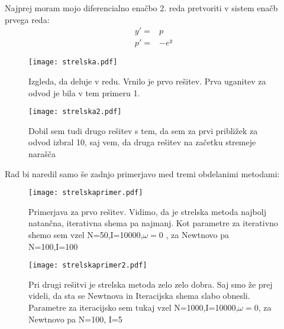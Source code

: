 \documentclass{article}
\begin{document}
Najprej moram mojo diferencialno enačbo 2. reda pretvoriti v sistem enačb prvega reda:
\begin{align*}
y' =& p \\
p' =& -e^y 
\end{align*}

\begin{figure}[H]
\texttt{[image: strelska.pdf]}
\caption*{Izgleda, da deluje v redu. Vrnilo je prvo rešitev. Prva uganitev za odvod je bila v tem primeru 1.} 
\end{figure}

\begin{figure}[H]
\texttt{[image: strelska2.pdf]}
\caption*{Dobil sem tudi drugo rešitev s tem, da sem za prvi približek za odvod izbral 10, saj vem, da druga rešitev na začetku stremeje narašča} 
\end{figure}

Rad bi naredil samo še zadnjo primerjavo med tremi obdelanimi metodami:

\begin{figure}[H]
\texttt{[image: strelskaprimer.pdf]}
\caption*{Primerjava za prvo rešitev. Vidimo, da je strelska metoda najbolj natančna, iterativna shema pa najmanj. Kot parametre za iterativno shemo sem vzel N=50,I=10000,$\omega=0$ , za Newtnovo pa N=100,I=100} 
\end{figure}

\begin{figure}[H]
\texttt{[image: strelskaprimer2.pdf]}
\caption*{Pri drugi rešitvi je strelska metoda zelo zelo dobra. Saj smo že prej videli, da sta se Newtnova in Iteracijska shema slabo obnesli. Parametre za iteracijsko sem tukaj vzel N=1000,I=10000,$\omega=0$, za Newtnovo pa N=100, I=5} 
\end{figure}
\end{document}
